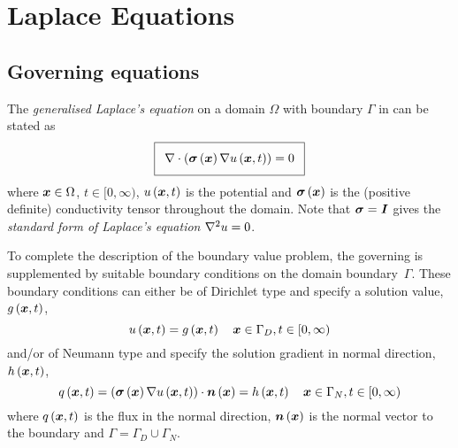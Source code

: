 \section{Laplace Equations}
\label{sec:LaplaceEquations}


\subsection{Governing equations}

The \emph{generalised Laplace's equation} on a domain $\Omega$ with boundary $\Gamma$
in \OpenCMISS can be stated as
\begin{equation}
  \addtolength{\fboxsep}{5pt}
  \boxed{
    \divergence{}{\pbrac{\fnof{\tensor{\sigma}}{\vectr{x}}\gradient{}{\fnof{u}{\vectr{x},t}}}}=0
  }
  \label{eqn:GeneralisedLaplaceEquation}
\end{equation}
where $ \boldsymbol{x} \in\Omega$, $t\in[0,\infty)$, $ u\left(  \boldsymbol{x} ,t \right) $ is the potential and 
$ \boldsymbol{\mathit{\sigma}}\left(  \boldsymbol{x}  \right) $ is the (positive definite) conductivity
tensor throughout the domain. Note that $\boldsymbol{\mathit{\sigma}}=\boldsymbol{\mathit{I}}$ gives 
the \emph{standard form of Laplace's equation} \ie $\laplacian{}{u}=0$.

To complete the description of the boundary value problem,
the governing  is supplemented
by suitable boundary conditions on the domain boundary~$\Gamma$.
These boundary conditions can either be of Dirichlet type and specify a
solution value, $ g\left(  \boldsymbol{x} ,t \right) $, \ie
\begin{equation}
  \fnof{u}{\vectr{x},t} = \fnof{g}{\vectr{x},t} \quad \vectr{x}\in\Gamma_{D},t\in[0,\infty)
  \label{eqn:LaplaceDirichletBC} 
\end{equation}
and/or of Neumann type and specify the solution gradient in normal direction,
$ h\left(  \boldsymbol{x} ,t \right) $, \ie
\begin{equation}
  \fnof{q}{\vectr{x},t} = \dotprod{\pbrac{\fnof{\tensor{\sigma}}{\vectr{x}}
      \gradient{}{\fnof{u}{\vectr{x},t}}}}{\fnof{\normal}{\vectr{x}}} =
  \fnof{h}{\vectr{x},t} \quad \vectr{x}\in\Gamma_{N},t\in[0,\infty)
  \label{eqn:LaplaceNeumannBC} 
\end{equation}
where $ q\left(  \boldsymbol{x} ,t \right) $ is the flux in the normal direction, $  \boldsymbol{n} \left(  \boldsymbol{x}  \right) $ is the normal
vector to the boundary and $\Gamma = \Gamma_D \cup \Gamma_N$.

